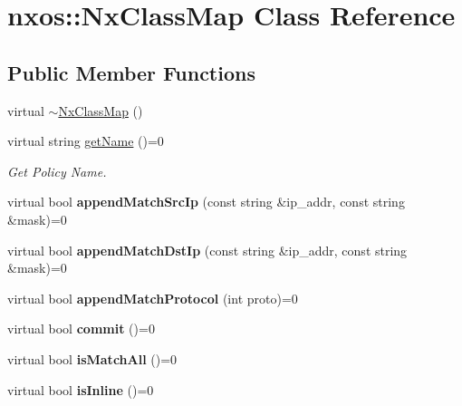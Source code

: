 \hypertarget{classnxos_1_1NxClassMap}{\section{nxos\-:\-:Nx\-Class\-Map Class Reference}
\label{classnxos_1_1NxClassMap}
}
\subsection*{Public Member Functions}
\begin{DoxyCompactItemize}
\item 
virtual \hyperlink{classnxos_1_1NxClassMap_a3810c21cf01e8e38e2bfae394513b099}{$\sim$\-Nx\-Class\-Map} ()
\item 
\hypertarget{classnxos_1_1NxClassMap_a463f52592e569f79839a009de3abf2a6}{virtual string \hyperlink{classnxos_1_1NxClassMap_a463f52592e569f79839a009de3abf2a6}{get\-Name} ()=0}\label{classnxos_1_1NxClassMap_a463f52592e569f79839a009de3abf2a6}

\begin{DoxyCompactList}\small\item\em Get Policy Name. \end{DoxyCompactList}\item 
\hypertarget{classnxos_1_1NxClassMap_a7478aecb8b176e81d350c8a104effaa3}{virtual bool {\bfseries append\-Match\-Src\-Ip} (const string \&ip\-\_\-addr, const string \&mask)=0}\label{classnxos_1_1NxClassMap_a7478aecb8b176e81d350c8a104effaa3}

\item 
\hypertarget{classnxos_1_1NxClassMap_a9627e6b9972a550730242c8738254ae2}{virtual bool {\bfseries append\-Match\-Dst\-Ip} (const string \&ip\-\_\-addr, const string \&mask)=0}\label{classnxos_1_1NxClassMap_a9627e6b9972a550730242c8738254ae2}

\item 
\hypertarget{classnxos_1_1NxClassMap_a5e725364c7e9403b79124b796e39fd31}{virtual bool {\bfseries append\-Match\-Protocol} (int proto)=0}\label{classnxos_1_1NxClassMap_a5e725364c7e9403b79124b796e39fd31}

\item 
\hypertarget{classnxos_1_1NxClassMap_ad6fb8bff31025bb1f04079d8a85f6e07}{virtual bool {\bfseries commit} ()=0}\label{classnxos_1_1NxClassMap_ad6fb8bff31025bb1f04079d8a85f6e07}

\item 
\hypertarget{classnxos_1_1NxClassMap_a24182925aacc6cfbcc037fa89e2307ea}{virtual bool {\bfseries is\-Match\-All} ()=0}\label{classnxos_1_1NxClassMap_a24182925aacc6cfbcc037fa89e2307ea}

\item 
\hypertarget{classnxos_1_1NxClassMap_a91ed7e3b3faf6a4d458b6304c2743e0d}{virtual bool {\bfseries is\-Inline} ()=0}\label{classnxos_1_1NxClassMap_a91ed7e3b3faf6a4d458b6304c2743e0d}

\end{DoxyCompactItemize}


